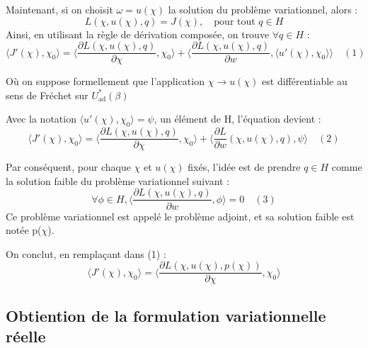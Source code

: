 Maintenant, si on choisit $\omega = u(\chi)$ la solution du problème variationnel, alors :
\[
L (\chi, u(\chi), q) = J(\chi), \quad \text{pour tout } q \in H 
\]
Ainsi, en utilisant la règle de dérivation composée, on trouve $\forall q \in H$ :
\[
\langle J'(\chi), \chi_0 \rangle = \langle \frac{\partial L (\chi, u(\chi), q)}{\partial \chi}, \chi_0 \rangle + \langle \frac{\partial L (\chi, u(\chi), q)}{\partial w}, \langle u'(\chi), \chi_0 \rangle \rangle \quad (1)
\]

Où on suppose formellement que l'application $\chi \to u(\chi)$ est différentiable au sens de Fréchet sur $U_{\text{ad}}^*(\beta)$

Avec la notation $\langle u'(\chi), \chi_0 \rangle = \psi$, un élément de H, l'équation devient :
\[
\langle J'(\chi), \chi_0 \rangle = \langle \frac{\partial L (\chi, u(\chi), q)}{\partial \chi}, \chi_0 \rangle + \langle \frac{\partial L}{\partial w} (\chi, u(\chi), q), \psi \rangle \quad (2)
\]

Par conséquent, pour chaque $\chi$ et $u(\chi)$ fixés, l'idée est de prendre $q \in H$ comme la solution faible du problème variationnel suivant :
\[
\forall \phi \in H, \langle \frac{\partial L (\chi, u(\chi), q)}{\partial w}, \phi \rangle = 0 \quad (3)
\]
Ce problème variationnel est appelé le problème adjoint, et sa solution faible est notée p($\chi$).


On conclut, en remplaçant dans (1)   :
\[
\langle J'(\chi), \chi_0 \rangle = \langle \frac{\partial L (\chi, u(\chi), p(\chi))}{\partial \chi}, \chi_0 \rangle
\]

\subsection{Obtiention de la formulation variationnelle réelle}

